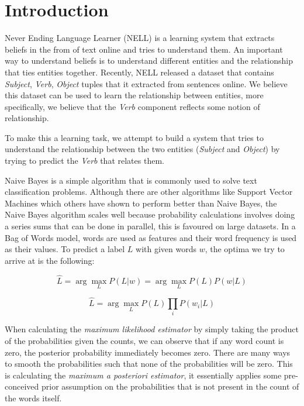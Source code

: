 \section{Introduction}

Never Ending Language Learner \cite{carlson2010toward} (NELL) is a learning system that extracts beliefs in the from of text online and tries to understand them. An important way to understand beliefs is to understand different entities and the relationship that ties entities together. Recently, NELL released a dataset that contains \emph{Subject}, \emph{Verb}, \emph{Object} tuples that it extracted from sentences online. We believe this dataset can be used to learn the relationship between entities, more specifically, we believe that the \emph{Verb} component reflects some notion of relationship.

To make this a learning task, we attempt to build a system that tries to understand the relationship between the two entities (\emph{Subject} and \emph{Object}) by trying to predict the \emph{Verb} that relates them.

Naive Bayes is a simple algorithm that is commonly used to solve text classification problems. Although there are other algorithms like Support Vector Machines which others have shown to perform better than Naive Bayes, the Naive Bayes algorithm scales well because probability calculations involves doing a series sums that can be done in parallel, this is favoured on large datasets. In a Bag of Words model, words are used as features and their word frequency is used as their values. To predict a label $L$ with given words $w$, the optima we try to arrive at is the following:

\begin{equation}
	\hat{L} = \arg\max_L P(L|w) = \arg\max_L P(L)P(w|L)
\end{equation}

\begin{equation}
	\hat{L} = \arg\max_L P(L) \prod_i{P(w_i|L)}
\end{equation}

When calculating the \emph{maximum likelihood estimator} by simply taking the product of the probabilities given the counts, we can observe that if any word count is zero, the posterior probability immediately becomes zero. There are many ways to smooth the probabilities such that none of the probabilities will be zero. This is calculating the \emph{maximum a posteriori estimator}, it essentially applies some pre-conceived prior assumption on the probabilities that is not present in the count of the words itself.

